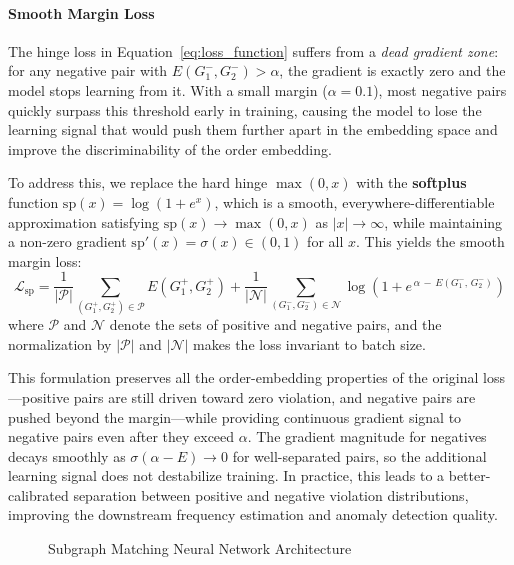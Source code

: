 \documentclass[pdflatex,sn-mathphys-num]{sn-jnl}%
\theoremstyle{thmstyleone}%
\theoremstyle{thmstyletwo}%
\theoremstyle{thmstylethree}%
\begin{document}
{\color{blue}
\paragraph{Smooth Margin Loss}
The hinge loss in Equation~\eqref{eq:loss_function} suffers from a \textit{dead gradient zone}: for any negative pair with $E(G^-_1, G^-_2) > \alpha$, the gradient is exactly zero and the model stops learning from it. With a small margin ($\alpha = 0.1$), most negative pairs quickly surpass this threshold early in training, causing the model to lose the learning signal that would push them further apart in the embedding space and improve the discriminability of the order embedding.

To address this, we replace the hard hinge $\max(0, x)$ with the \textbf{softplus} function $\text{sp}(x) = \log(1 + e^{x})$, which is a smooth, everywhere-differentiable approximation satisfying $\text{sp}(x) \to \max(0, x)$ as $|x| \to \infty$, while maintaining a non-zero gradient $\text{sp}'(x) = \sigma(x) \in (0,1)$ for all $x$. This yields the smooth margin loss:
\begin{equation}
\label{eq:softplus_loss}
\mathcal{L}_{\text{sp}} = \frac{1}{|\mathcal{P}|}\sum_{(G^+_1, G^+_2) \in \mathcal{P}} E(G^+_1, G^+_2) + \frac{1}{|\mathcal{N}|}\sum_{\left(G^-_1, G^-_2\right) \in \mathcal{N}} \log\!\left(1 + e^{\,\alpha\, - \,E(G^-_1,\, G^-_2)}\right)
\end{equation}
where $\mathcal{P}$ and $\mathcal{N}$ denote the sets of positive and negative pairs, and the normalization by $|\mathcal{P}|$ and $|\mathcal{N}|$ makes the loss invariant to batch size.

This formulation preserves all the order-embedding properties of the original loss---positive pairs are still driven toward zero violation, and negative pairs are pushed beyond the margin---while providing continuous gradient signal to negative pairs even after they exceed $\alpha$. The gradient magnitude for negatives decays smoothly as $\sigma(\alpha - E) \to 0$ for well-separated pairs, so the additional learning signal does not destabilize training. In practice, this leads to a better-calibrated separation between positive and negative violation distributions, improving the downstream frequency estimation and anomaly detection quality.
}

\begin{figure}[H]
    \centering
    \resizebox{1\linewidth}{!}{}
    \caption{Subgraph Matching Neural Network Architecture}
    \label{fig:network}
\end{figure}
\end{document}
